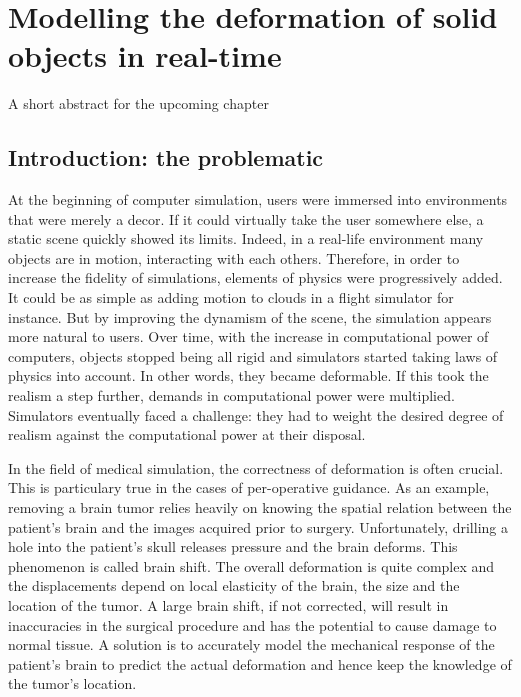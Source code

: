 \chapter{Modelling the deformation of solid objects in real-time}
\label{chap4}
\begin{shortAbstract}
A short abstract for the upcoming chapter
\end{shortAbstract}


\section{Introduction: the problematic}

At the beginning of computer simulation, users were immersed into environments that were merely a decor. If it could virtually take the user somewhere else, a static scene quickly showed its limits. Indeed, in a real-life environment many objects are in motion, interacting with each others. Therefore, in order to increase the fidelity of simulations, elements of physics were progressively added. It could be as simple as adding motion to clouds in a flight simulator for instance. But by improving the dynamism of the scene, the simulation appears more natural to users. Over time, with the increase in computational power of computers, objects stopped being all rigid and simulators started taking laws of physics into account. In other words, they became deformable. If this took the realism a step further, demands in computational power were multiplied. Simulators eventually faced a challenge: they had to weight the desired degree of realism against the computational power at their disposal. 

In the field of medical simulation, the correctness of deformation is often crucial. This is particulary true in the cases of per-operative guidance. As an example, removing a brain tumor relies heavily on knowing the spatial relation between the patient's brain and the images acquired prior to surgery. Unfortunately, drilling a hole into the patient's skull releases pressure and the brain deforms. This phenomenon is called brain shift. The overall deformation is quite complex and the displacements depend on local elasticity of the brain, the size and the location of the tumor. A large brain shift, if not corrected, will result in inaccuracies in the surgical procedure and has the potential to cause damage to normal tissue. A solution is to accurately model the mechanical response of the patient's brain to predict the actual deformation and hence keep the knowledge of the tumor's location. 

